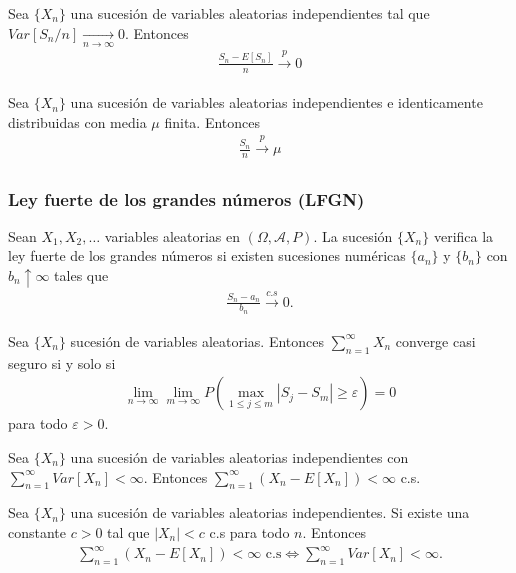\begin{teo}[Markov]
     Sea $\{X_n\}$ una sucesión de variables aleatorias independientes tal que $Var[S_n/n] \xrightarrow[n\to \infty]{} 0$. Entonces
    \begin{align*}
        \frac{S_n - E[S_n]}{n} \xrightarrow[\quad]{p} 0
    \end{align*}
\end{teo}

\begin{teo}[Khinchin]
    Sea $\{X_n\}$ una sucesión de variables aleatorias independientes e identicamente distribuidas con media $\mu$ finita. Entonces
    \begin{align*}
        \frac{S_n}{n} \xrightarrow[\quad]{p} \mu
    \end{align*}
\end{teo}

\subsubsection{Ley fuerte de los grandes números (LFGN)}
\noindent Sean $X_1,X_2,\ldots$ variables aleatorias en $(\Omega, \mathcal{A}, P)$. La sucesión $\{X_n\}$ verifica la ley fuerte de los grandes números si existen sucesiones numéricas $\{a_n\}$ y $\{b_n\}$ con $b_n \uparrow \infty$ tales que
\begin{align*}
    \frac{S_n - a_n}{b_n} \xrightarrow[]{c.s} 0.
\end{align*}

\begin{lema}
    Sea $\{X_n\}$ sucesión de variables aleatorias. Entonces $\sum_{n=1}^{\infty} X_n$ converge casi seguro si y solo si
    \begin{align*}
        \lim_{n \to \infty} \lim_{m \to \infty} P\left( \max_{1 \leq j \leq m} |S_j - S_m| \ge \varepsilon \right) = 0
    \end{align*}
    para todo $\varepsilon > 0$.
\end{lema}

\begin{teo}
    Sea $\{X_n\}$ una sucesión de variables aleatorias independientes con $\sum_{n=1}^{\infty} Var[X_n] < \infty$. Entonces $\sum_{n=1}^{\infty}(X_n - E[X_n]) < \infty$ c.s.
\end{teo}

\begin{teo}
    Sea $\{X_n\}$ una sucesión de variables aleatorias independientes. Si existe una constante $c>0$ tal que $|X_n| < c$ c.s para todo $n$. Entonces
    \begin{align*}
        \sum_{n=1}^{\infty}(X_n - E[X_n]) < \infty \text{ c.s} \Longleftrightarrow \sum_{n=1}^{\infty} Var[X_n] < \infty.
    \end{align*}
\end{teo}

